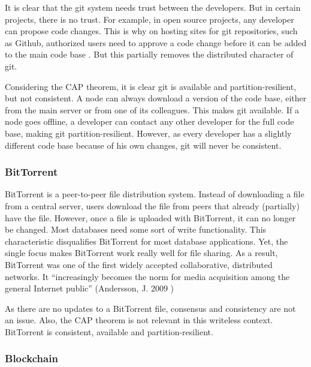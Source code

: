 It is clear that the git system needs trust between the developers. But in certain projects, there is no trust. For example, in open source projects, any developer can propose code changes. This is why on hosting sites for git repositories, such as Github, authorized users need to approve a code change before it can be added to the main code base \cite{github-pr}. But this partially removes the distributed character of git.

Considering the CAP theorem, it is clear git is available and partition-resilient, but not consistent. A node can always download a version of the code base, either from the main server or from one of its colleagues. This makes git available. If a node goes offline, a developer can contact any other developer for the full code base, making git partition-resilient. However, as every developer has a slightly different code base because of his own changes, git will never be consistent.

\subsubsection{BitTorrent}

BitTorrent is a peer-to-peer file distribution system. Instead of downloading a file from a central server, users download the file from peers that already (partially) have the file. However, once a file is uploaded with BitTorrent, it can no longer be changed. Most databases need some sort of write functionality. This characteristic disqualifies BitTorrent for most database applications. Yet, the single focus makes BitTorrent work really well for file sharing. As a result, BitTorrent was one of the first widely accepted collaborative, distributed networks. It ``increasingly becomes the norm for media acquisition among the general Internet public'' (Andersson, J. 2009 \cite{bittorrent-norm})

As there are no updates to a BitTorrent file, consensus and consistency are not an issue. Also, the CAP theorem is not relevant in this writeless context. BitTorrent is consistent, available and partition-resilient.

\subsubsection{Blockchain}
\label{subsubsec:blockchain-as-distributed-dbs}

